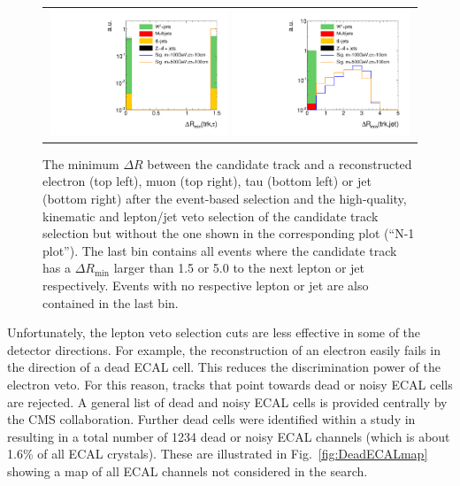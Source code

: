 \begin{figure}[!b]
\begin{tabular}{c}
    \includegraphics[width=0.49\textwidth]{figures/analysis_2/AnalysisSelection/htrackdRminTau_log.pdf}
    \includegraphics[width=0.49\textwidth]{figures/analysis_2/AnalysisSelection/htrackdRminJet_log.pdf}
  \end{tabular}
  \caption{The minimum $\Delta R$ between the candidate track and a reconstructed electron (top left), muon (top right), tau (bottom left) or jet (bottom right) 
           after the event-based selection and the high-quality, kinematic and lepton/jet veto selection of the candidate track selection but without the one shown in the corresponding plot (``N-1 plot''). 
           The last bin contains all events where the candidate track has a $\Delta R_{\text{min}}$ larger than 1.5 or 5.0 to the next lepton or jet respectively. 
           Events with no respective lepton or jet are also contained in the last bin.}
  \label{fig:TrackdRmin}
  \vspace{25pt}
\end{figure}

Unfortunately, the lepton veto selection cuts are less effective in some of the detector directions.
For example, the reconstruction of an electron easily fails in the direction of a dead ECAL cell.
This reduces the discrimination power of the electron veto.
For this reason, tracks that point towards dead or noisy ECAL cells are rejected.
A general list of dead and noisy ECAL cells is provided centrally by the CMS collaboration.
Further dead cells were identified within a study in~\cite{bib:CMS:DT_Thesis,bib:CMS:DT_8TeV_AN} resulting in a total number of 1234 dead or noisy ECAL channels (which is about 1.6\% of all ECAL crystals). 
These are illustrated in Fig.~\ref{fig:DeadECALmap} showing a map of all ECAL channels not considered in the search.


